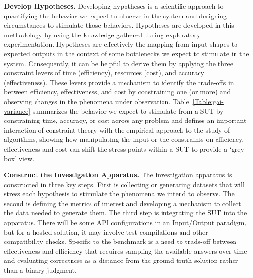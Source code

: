 \textbf{Develop Hypotheses.}
Developing hypotheses is a scientific approach to quantifying the behavior we expect to observe in the system and designing circumstances to stimulate those behaviors. 
Hypotheses are developed in this methodology by using the knowledge gathered during exploratory experimentation.
Hypotheses are effectively the mapping from input shapes to expected outputs in the context of some bottlenecks we expect to stimulate in the system.
Consequently, it can be helpful to derive them by applying the three constraint levers of time (efficiency), resources (cost), and accuracy (effectiveness). 
These levers provide a mechanism to identify the trade-offs in \gai between efficiency, effectiveness, and cost by constraining one (or more) and observing changes in the phenomena under observation.
Table~\ref{Table:gai-variance} summarizes the behavior we expect to stimulate from a \ac{SUT} by constraining time, accuracy, or cost across any \gai problem and defines an important interaction of constraint theory with the empirical approach to the study of algorithms, showing how manipulating the input or the constraints on efficiency, effectiveness and cost can shift the stress points within a \ac{SUT} to provide a `grey-box' view.





\textbf{Construct the Investigation Apparatus.}
The investigation apparatus is constructed in three key steps.
First is collecting or generating datasets that will stress each hypothesis to stimulate the phenomena we intend to observe. 
The second is defining the metrics of interest and developing a mechanism to collect the data needed to generate them. 
The third step is integrating the \ac{SUT} into the apparatus.
There will be some API configurations in an Input/Output paradigm, but for a hosted solution, it may involve test compilations and other compatibility checks.
Specific to the \gai benchmark is a need to trade-off between effectiveness and efficiency that requires sampling the available answers over time and evaluating correctness as a distance from the ground-truth solution rather than a binary judgment. 

